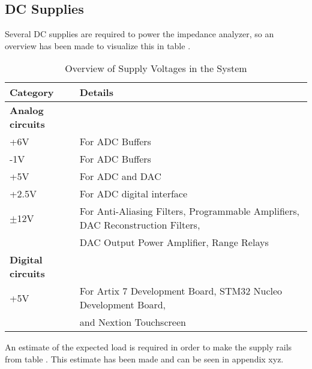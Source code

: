 \subsection{DC Supplies} \label{subsec:DCSupples}

Several DC supplies are required to power the impedance analyzer, so an overview has been made to visualize this in table .
\begin{table}[ht]
\centering
\begin{tabular}{@{}ll@{}}
\toprule
\textbf{Category}       & \textbf{Details}                                                                                 \\ \midrule
\textbf{Analog circuits} &                                                                                                 \\
\quad +6V                & For ADC Buffers                                                                                \\
\quad -1V                & For ADC Buffers                                                                                \\
\quad +5V                & For ADC and DAC                                                                                \\
\quad +2.5V              & For ADC digital interface                                                                      \\
\quad $\pm$12V           & For Anti-Aliasing Filters, Programmable Amplifiers, DAC Reconstruction Filters,                \\
                         & DAC Output Power Amplifier, Range Relays                                                       \\ \midrule
\textbf{Digital circuits} &                                                                                                 \\
\quad +5V                & For Artix 7 Development Board, STM32 Nucleo Development Board,                                 \\
                         & and Nextion Touchscreen                                                                        \\ \bottomrule
\end{tabular}
\caption{Overview of Supply Voltages in the System}
\label{tab:7_1_6_Supply_Voltages}
\end{table}

An estimate of the expected load is required in order to make the supply rails from table . This estimate has been made and can be seen in appendix xyz.




